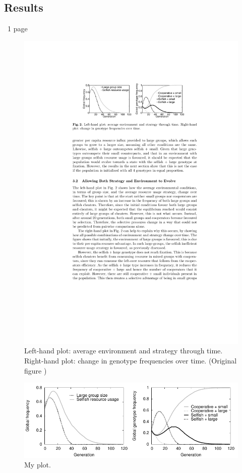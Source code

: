 \documentclass[11pt]{article}
\begin{document}
\subsection{Results}
~1 page

\begin{figure}[!ht]
  \centering
  \includegraphics[scale=1.25]{original.pdf}
  \caption{Left-hand plot: average environment and strategy through time. Right-hand plot: change in genotype frequencies over time. (Original figure \citep{orig})}
  \label{Figure:original}
\end{figure}

\begin{figure}[!ht]
  \centering
  \includegraphics{equalplot.pdf}
  \caption{My plot.}
  \label{Figure:plot}
\end{figure}
\end{document}
